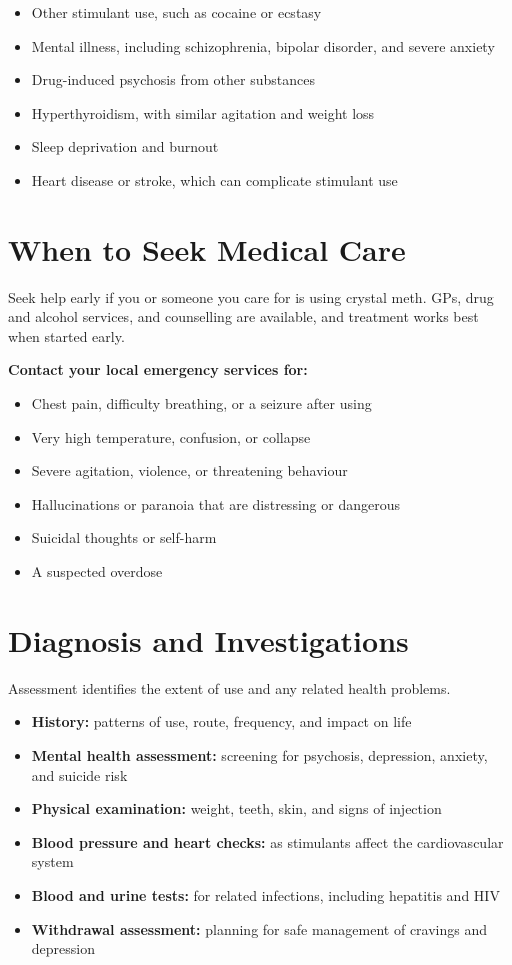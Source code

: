 \begin{itemize}
    \item Other stimulant use, such as cocaine or ecstasy
    \item Mental illness, including schizophrenia, bipolar disorder, and severe anxiety
    \item Drug-induced psychosis from other substances
    \item Hyperthyroidism, with similar agitation and weight loss
    \item Sleep deprivation and burnout
    \item Heart disease or stroke, which can complicate stimulant use
\end{itemize}

\section*{When to Seek Medical Care}
Seek help early if you or someone you care for is using crystal meth. GPs, drug and alcohol services, and counselling are available, and treatment works best when started early.

\textbf{Contact your local emergency services for:}
\begin{itemize}
    \item Chest pain, difficulty breathing, or a seizure after using
    \item Very high temperature, confusion, or collapse
    \item Severe agitation, violence, or threatening behaviour
    \item Hallucinations or paranoia that are distressing or dangerous
    \item Suicidal thoughts or self-harm
    \item A suspected overdose
\end{itemize}

\section*{Diagnosis and Investigations}
Assessment identifies the extent of use and any related health problems.

\begin{itemize}
    \item \textbf{History:} patterns of use, route, frequency, and impact on life
    \item \textbf{Mental health assessment:} screening for psychosis, depression, anxiety, and suicide risk
    \item \textbf{Physical examination:} weight, teeth, skin, and signs of injection
    \item \textbf{Blood pressure and heart checks:} as stimulants affect the cardiovascular system
    \item \textbf{Blood and urine tests:} for related infections, including hepatitis and HIV
    \item \textbf{Withdrawal assessment:} planning for safe management of cravings and depression
\end{itemize}

